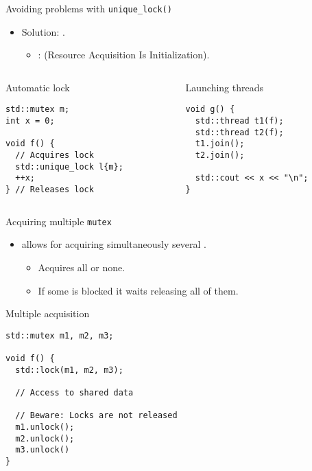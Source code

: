 \begin{frame}[t,fragile]{Avoiding problems with \texttt{unique\_lock()}}
\begin{itemize}
  \item Solution: .
    \begin{itemize}
      \item {}:  (Resource Acquisition Is Initialization).
    \end{itemize}
\end{itemize}

\begin{columns}[T]
\begin{column}{.5\textwidth}
\begin{block}{Automatic lock}
\begin{lstlisting}
std::mutex m;
int x = 0;

void f() {
  // Acquires lock
  std::unique_lock l{m}; 
  ++x;
} // Releases lock
\end{lstlisting}
\end{block}
\end{column}

\begin{column}{.5\textwidth}
\begin{block}{Launching threads}
\begin{lstlisting}
void g() {
  std::thread t1(f); 
  std::thread t2(f);
  t1.join(); 
  t2.join();

  std::cout << x << "\n";
}
\end{lstlisting}
\end{block}
\end{column}
\end{columns}
\end{frame}

\begin{frame}[t,fragile]{Acquiring multiple \texttt{mutex}}
\begin{itemize}
  \item {} allows for acquiring simultaneously several .
    \begin{itemize}
      \item Acquires all or none.
      \item If some is blocked it waits releasing all of them.
    \end{itemize}
\end{itemize}

\begin{block}{Multiple acquisition}
\begin{lstlisting}
std::mutex m1, m2, m3;

void f() {
  std::lock(m1, m2, m3);

  // Access to shared data

  // Beware: Locks are not released
  m1.unlock();
  m2.unlock();
  m3.unlock()
} 
\end{lstlisting}
\end{block}
\end{frame}

